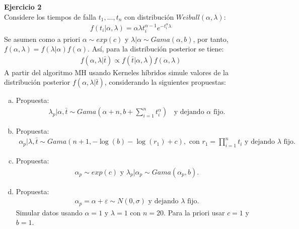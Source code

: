 \documentclass[a4paper, 11pt]{article}
\newenvironment{problem}[2][Ejercicio]
{ \begin{mdframed}[backgroundcolor= red!50] \textbf{#1 #2} \\}
	{  \end{mdframed}}
\begin{document}
\begin{problem}{2} 
  Considere los tiempos de falla $t_1,...,t_n$ con distribución $Weibull(\alpha,\lambda)$:
    \begin{align*}
      f(t_i|\alpha,\lambda) = \alpha \lambda t_i^{\alpha-1} e^{-t_i^{\alpha}\lambda}
    \end{align*}
    Se asumen como a priori $\alpha \sim exp(c)$ y $\lambda|\alpha \sim Gama(\alpha,b)$, por tanto, $f(\alpha, \lambda) = f(\lambda|\alpha)f(\alpha)$. Así, para la distribución posterior se tiene:
    \begin{align*}
      f(\alpha,\lambda|\bar{t}) \propto f(\bar{t}|\alpha, \lambda)f(\alpha,\lambda) 
    \end{align*}
    A partir del algoritmo MH usando Kerneles híbridos simule valores de la distribución posterior $f(\alpha, \lambda|\bar{t})$, considerando la siguientes propuestas:
    \begin{enumerate}[a)]
      \item Propuesta: 
      \begin{align*}
        \lambda_p |\alpha, \bar{t} \sim Gama \left(\alpha + n , b + \sum_{i = 1 }^{n}t_i^{\alpha}\right) \:\:\:\: \text{y dejando $\alpha$ fijo.} 
      \end{align*}
      \item Propuesta:
      \begin{align*}
        \alpha_p|\lambda, \bar{t} \sim Gama(n+1, -\log(b)-\log(r_1)+c), \text{ con }  r_1 = \prod_{i=1}^{n}t_i \text{ y dejando $\lambda$ fijo.}
      \end{align*}
      \item Propuesta:
      \begin{align*}
        \alpha_p \sim exp(c) \text{ y } \lambda_p |\alpha_p \sim Gama(\alpha_p,b).
      \end{align*}
      \item Propuesta:
      \begin{align*}
        \alpha_p = \alpha + \varepsilon \sim N(0,\sigma) \text{ y dejando $\lambda$ fijo.} 
      \end{align*}
      Simular datos usando $\alpha = 1$ y $\lambda =1$ con $n = 20$. Para la priori usar $c= 1$ y $ b = 1$.
    \end{enumerate}

\end{problem}
  
\end{document}
